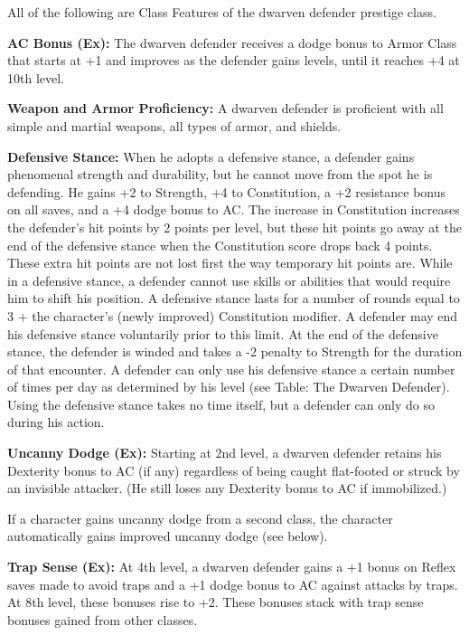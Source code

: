 \ClassFeatures

All of the following are Class Features of the dwarven defender prestige class.

\textbf{AC Bonus (Ex):} The dwarven defender receives a dodge bonus to Armor Class 
that starts at +1 and improves as the defender gains levels, until it reaches +4 
at 10th level.

\textbf{Weapon and Armor Proficiency:} A dwarven defender is proficient with all 
simple and martial weapons, all types of armor, and shields.

\textbf{Defensive Stance:} When he adopts a defensive stance, a defender gains 
phenomenal strength and durability, but he cannot move from the spot he is defending. 
He gains +2 to Strength, +4 to Constitution, a +2 resistance bonus on all saves, 
and a +4 dodge bonus to AC. The increase in Constitution increases the defender's 
hit points by 2 points per level, but these hit points go away at the end of the 
defensive stance when the Constitution score drops back 4 points. These extra hit 
points are not lost first the way temporary hit points are. While in a defensive 
stance, a defender cannot use skills or abilities that would require him to shift 
his position. A defensive stance lasts for a number of rounds equal to 3 + the 
character's (newly improved) Constitution modifier. A defender may end his defensive 
stance voluntarily prior to this limit. At the end of the defensive stance, the 
defender is winded and takes a -2 penalty to Strength for the duration of that 
encounter. A defender can only use his defensive stance a certain number of times 
per day as determined by his level (see Table: The Dwarven Defender). Using the 
defensive stance takes no time itself, but a defender can only do so during his 
action.

\textbf{Uncanny Dodge (Ex):} Starting at 2nd level, a dwarven defender retains 
his Dexterity bonus to AC (if any) regardless of being caught flat-footed or struck 
by an invisible attacker. (He still loses any Dexterity bonus to AC if immobilized.)

If a character gains uncanny dodge from a second class, the character automatically 
gains improved uncanny dodge (see below).

\textbf{Trap Sense (Ex):} At 4th level, a dwarven defender gains a +1 bonus on 
Reflex saves made to avoid traps and a +1 dodge bonus to AC against attacks by 
traps. At 8th level, these bonuses rise to +2. These bonuses stack with trap sense 
bonuses gained from other classes.

